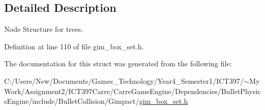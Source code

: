 \subsection{Detailed Description}
Node Structure for trees. 

Definition at line 110 of file gim\_\-box\_\-set.h.

The documentation for this struct was generated from the following file:\begin{CompactItemize}
\item 
C:/Users/New/Documents/Games\_\-Technology/Year4\_\-Semester1/ICT397/$\sim$My Work/Assignment2/ICT397Carre/CarreGameEngine/Dependencies/BulletPhysicsEngine/include/BulletCollision/Gimpact/\hyperlink{gim__box__set_8h}{gim\_\-box\_\-set.h}\end{CompactItemize}
